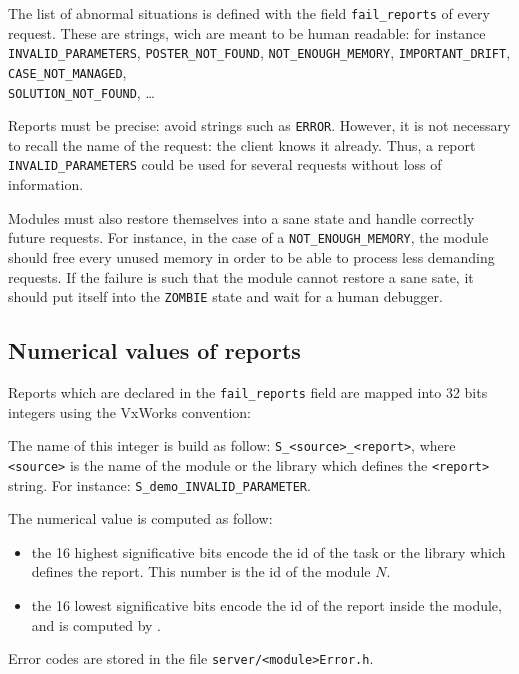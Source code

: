 The list of abnormal situations is defined with the field \texttt{fail\_reports}
of every   request.  These   are strings,   wich are   meant to be  human
readable:       for      instance  \texttt{INVALID\_PARAMETERS},   
\texttt{POSTER\_NOT\_FOUND}, \texttt{NOT\_ENOUGH\_MEMORY},   \texttt{IMPORTANT\_DRIFT},
\texttt{CASE\_NOT\_MANAGED},\\ \texttt{SOLUTION\_NOT\_FOUND}, \ldots

Reports must be precise:  avoid strings such  as \texttt{ERROR}. However, it
is not necessary to recall the name  of the request:  the client knows it
already.  Thus, a  report \texttt{INVALID\_PARAMETERS}   could be used  for
several requests without loss of information.

Modules must  also   restore  themselves into  a  sane  state  and handle
correctly future   requests.   For  instance, in  the   case  of  a  
\texttt{NOT\_ENOUGH\_MEMORY}, the module should free every unused memory in order
to be able to process  less demanding requests.  If  the failure is  such
that the module cannot restore a sane sate, it should put itself into the
\texttt{ZOMBIE} state and wait for a human debugger.


\subsection{Numerical values of reports}

Reports which  are declared in the \texttt{fail\_reports} field are mapped into
32 bits integers using the VxWorks convention:

The name of this integer is build as follow: \texttt{S\_<source>\_<report>},
where \texttt{<source>} is the name of the module or the library which defines
the      \texttt{<report>}     string.    For       instance:     
\texttt{S\_demo\_INVALID\_PARAMETER}.

The numerical value is computed as follow:
\begin{itemize}
\item the 16 highest significative bits encode the id of the task or
the  library which  defines the report.   This  number is  the  id of the
module  $N$.

\item the 16 lowest significative bits encode the id of the report
inside the module, and is computed by \GenoM.
\end{itemize}

Error codes are stored in the file \texttt{server/<module>Error.h}.



